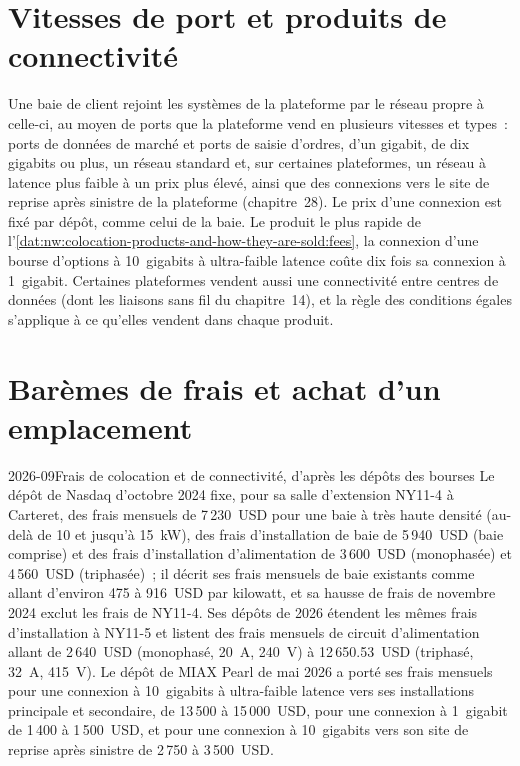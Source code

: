 \section{Vitesses de port et produits de connectivité}

Une baie de client rejoint les systèmes de la plateforme par le réseau propre à celle-ci, au moyen de ports que la plateforme vend en plusieurs vitesses et
types~: ports de données de marché et ports de saisie d'ordres, d'un gigabit, de dix gigabits ou plus, un réseau standard et, sur certaines plateformes, un réseau à latence plus faible
à un prix plus élevé, ainsi que des connexions vers le site de reprise après sinistre de la plateforme (chapitre~28). Le prix d'une connexion est fixé par dépôt, comme
celui de la baie. Le produit le plus rapide de l'\cref{dat:nw:colocation-products-and-how-they-are-sold:fees}, la connexion d'une bourse d'options à 10~gigabits
à ultra-faible latence coûte dix fois sa connexion à 1~gigabit. Certaines plateformes vendent aussi une connectivité entre centres de données
(dont les liaisons sans fil du chapitre~14), et la règle des conditions égales s'applique à ce qu'elles vendent dans chaque produit.

\section{Barèmes de frais et achat d'un emplacement}

\begin{dated}{2026-09}{Frais de colocation et de connectivité, d'après les dépôts des bourses}\label{dat:nw:colocation-products-and-how-they-are-sold:fees}
Le dépôt de Nasdaq d'octobre 2024 fixe, pour sa salle d'extension NY11-4 à Carteret, des frais mensuels de 7\,230~USD pour une baie à très haute densité
(au-delà de 10 et jusqu'à \qty{15}{\kilo\watt}), des frais d'installation de baie de 5\,940~USD (baie comprise) et des frais d'installation d'alimentation de
3\,600~USD (monophasée) et 4\,560~USD (triphasée)~; il décrit ses frais mensuels de baie existants comme allant d'environ 475 à 916~USD
par kilowatt, et sa hausse de frais de novembre 2024 exclut les frais de NY11-4. Ses dépôts de 2026 étendent les mêmes frais d'installation à NY11-5
et listent des frais mensuels de circuit d'alimentation allant de 2\,640~USD (monophasé, 20~A, 240~V) à 12\,650.53~USD (triphasé, 32~A, 415~V). Le dépôt de MIAX Pearl
de mai 2026 a porté ses frais mensuels pour une connexion à 10~gigabits à ultra-faible latence vers ses installations principale et secondaire, de
13\,500 à 15\,000~USD, pour une connexion à 1~gigabit de 1\,400 à 1\,500~USD, et pour une connexion à 10~gigabits vers son site de reprise après sinistre
de 2\,750 à 3\,500~USD.
\end{dated}

